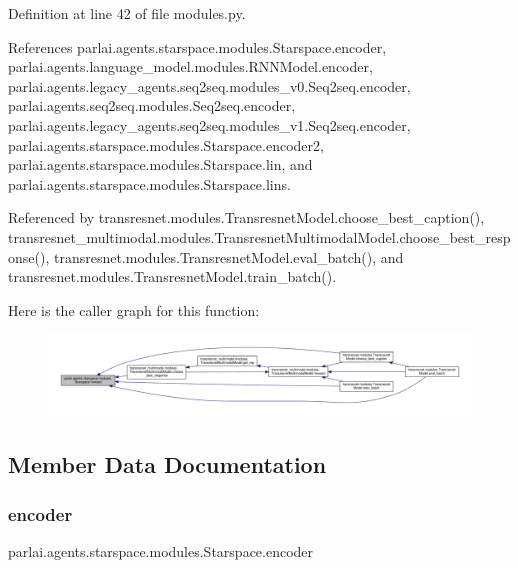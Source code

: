 Definition at line 42 of file modules.\+py.



References parlai.\+agents.\+starspace.\+modules.\+Starspace.\+encoder, parlai.\+agents.\+language\+\_\+model.\+modules.\+R\+N\+N\+Model.\+encoder, parlai.\+agents.\+legacy\+\_\+agents.\+seq2seq.\+modules\+\_\+v0.\+Seq2seq.\+encoder, parlai.\+agents.\+seq2seq.\+modules.\+Seq2seq.\+encoder, parlai.\+agents.\+legacy\+\_\+agents.\+seq2seq.\+modules\+\_\+v1.\+Seq2seq.\+encoder, parlai.\+agents.\+starspace.\+modules.\+Starspace.\+encoder2, parlai.\+agents.\+starspace.\+modules.\+Starspace.\+lin, and parlai.\+agents.\+starspace.\+modules.\+Starspace.\+lins.



Referenced by transresnet.\+modules.\+Transresnet\+Model.\+choose\+\_\+best\+\_\+caption(), transresnet\+\_\+multimodal.\+modules.\+Transresnet\+Multimodal\+Model.\+choose\+\_\+best\+\_\+response(), transresnet.\+modules.\+Transresnet\+Model.\+eval\+\_\+batch(), and transresnet.\+modules.\+Transresnet\+Model.\+train\+\_\+batch().

Here is the caller graph for this function\+:
\nopagebreak
\begin{figure}[H]
\begin{center}
\leavevmode
\includegraphics[width=350pt]{classparlai_1_1agents_1_1starspace_1_1modules_1_1Starspace_a08e4e81ef10c1ec4c09ab6c8147690ab_icgraph}
\end{center}
\end{figure}


\subsection{Member Data Documentation}
\mbox{\label{classparlai_1_1agents_1_1starspace_1_1modules_1_1Starspace_aa93228651180a1901e55585fe9008002}} 
\subsubsection{\texorpdfstring{encoder}{encoder}}
{\footnotesize\ttfamily parlai.\+agents.\+starspace.\+modules.\+Starspace.\+encoder}



